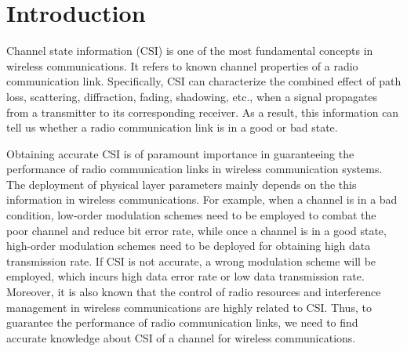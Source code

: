 \documentclass[10pt,journal,cspaper,compsoc]{IEEEtran}
\begin{document}
\maketitle

%

\IEEEdisplaynotcompsoctitleabstractindextext
\IEEEpeerreviewmaketitle



\section{Introduction }
\label{sec:intr}



Channel state information (CSI) is one of the most fundamental concepts in wireless communications. It refers to known channel properties of a radio communication link. Specifically, CSI can characterize the combined effect of path loss, scattering, diffraction, fading, shadowing, etc., when a signal propagates from a transmitter to its corresponding receiver. As a result, this information can tell us whether a radio communication link is in a good or bad state. 

Obtaining accurate CSI is of paramount importance in guaranteeing the performance of radio communication links in wireless communication systems. The deployment of physical layer parameters mainly depends on the this information in wireless communications. For example, when a channel is in a bad condition, low-order modulation schemes need to be employed to combat the poor channel and reduce bit error rate, while once a channel is in a good state, high-order modulation schemes need to be deployed for obtaining high data transmission rate. If CSI is not accurate, a wrong modulation scheme will be employed, which incurs high data error rate or low data transmission rate. Moreover, it is also known that the control of radio resources \cite{} and interference management \cite{} in wireless communications are highly related to CSI. Thus, to guarantee the performance of radio communication links, we need to find accurate knowledge about CSI of a channel for wireless communications.
\end{document}
